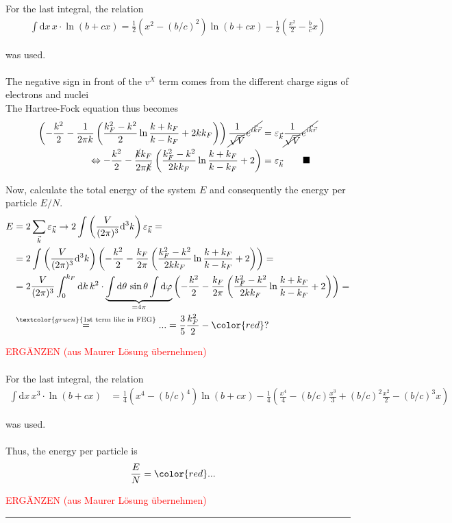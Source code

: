 \documentclass{article}
\newcommand{\diff}{\mathrm{d}}
\newcommand{\lr}[1]{\left(#1\right)}
\newcommand{\commenttext}[1]{\textcolor{gruen}{\text{#1}}}
\begin{document}
{	For the last integral, the relation
		\begin{align*}
			\int \diff x \, x \cdot \ln(b+cx) = \frac{1}{2}(x^2 - (b/c)^2) \ln(b+cx) - \frac{1}{2} \lr{ \frac{x^2}{2} - \frac{b}{c}x }
		\end{align*}
	
	was used.\\
	\\
	\textcolor{gruen}{The negative sign in front of the $v^X$ term comes from the different charge signs of electrons and nuclei}\\
	The Hartree-Fock equation thus becomes
		\begin{align*}
			\lr{ -\frac{k^2}{2} - \frac{1}{2\pi k} \lr{ \frac{k_F^2 - k^2}{2} \ln\frac{k+k_F}{k-k_F} + 2kk_F } } \cancel{ \frac{1}{\sqrt{V}} e^{i\vec{k}\vec{r}} } &= \varepsilon_{\vec{k}} \cancel{ \frac{1}{\sqrt{V}} e^{i\vec{k}\vec{r}} } \\
			\Leftrightarrow -\frac{k^2}{2} - \frac{\cancel{k}k_F}{2\pi \cancel{k}} \lr{ \frac{k_F^2 - k^2}{2kk_F} \ln\frac{k+k_F}{k-k_F} + 2 } &= \varepsilon_{\vec{k}} \qquad\blacksquare
		\end{align*}
	
	Now, calculate the total energy of the system $E$ and consequently the energy per particle $E/N$.
		\begin{align*}
			E &= 2 \sum_{\vec{k}} \varepsilon_{\vec{k}} \to 2\int \lr{ \frac{V}{(2\pi)^3} \diff^3k } \varepsilon_{\vec{k}} = 	\\
			&= 2\int \lr{ \frac{V}{(2\pi)^3} \diff^3k } \lr{ -\frac{k^2}{2} - \frac{k_F}{2\pi} \lr{ \frac{k_F^2 - k^2}{2kk_F} \ln\frac{k+k_F}{k-k_F} + 2 } } = \\
			&= 2\frac{V}{(2\pi)^3} \int_0^{k_F} \diff k\, k^2 \cdot \underbrace{ \int \diff\theta \, \sin\theta \int \diff\varphi }_{=4\pi} \lr{ -\frac{k^2}{2} - \frac{k_F}{2\pi} \lr{ \frac{k_F^2 - k^2}{2kk_F} \ln\frac{k+k_F}{k-k_F} + 2 } } = \\
			&\stackrel{\commenttext{1st term like in FEG}}{=} ... = \frac{3}{5}\frac{k_F^2}{2} - {\color{red}?}
		\end{align*}
	
	\textcolor{red}{ERGÄNZEN (aus Maurer Lösung übernehmen)}\\
	\\
	For the last integral, the relation
		\begin{align*}
			\int \diff x \, x^3 \cdot \ln(b + cx) &= \frac{1}{4}(x^4 - (b/c)^4) \ln(b+cx) - \frac{1}{4}\lr{ \frac{x^4}{4} - (b/c)\frac{x^3}{3} + (b/c)^2\frac{x^2}{2} - (b/c)^3x}
		\end{align*}
	
	was used.\\
	\\
	Thus, the energy per particle is
		\begin{align*}
			\frac{E}{N} &= {\color{red}...}
		\end{align*}
	
	\textcolor{red}{ERGÄNZEN (aus Maurer Lösung übernehmen)}
\hrule
}
\end{document}
